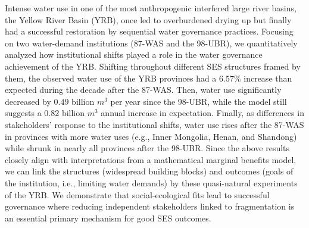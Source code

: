 
Intense water use in one of the most anthropogenic interfered large river basins, the Yellow River Basin (YRB), once led to overburdened drying up but finally had a successful restoration by sequential water governance practices.
Focusing on two water-demand institutions (87-WAS and the 98-UBR), we quantitatively analyzed how institutional shifts played a role in the water governance achievement of the YRB.
Shifting throughout different SES structures framed by them, the observed water use of the YRB provinces had a $6.57\%$ increase than expected during the decade after the 87-WAS.
Then, water use significantly decreased by $0.49$ billion $m^3$ per year since the 98-UBR, while the model still suggests a $0.82$ billion $m^3$ annual increase in expectation.
Finally, as differences in stakeholders' response to the institutional shifts, water use rises after the 87-WAS in provinces with more water uses (e.g., Inner Mongolia, Henan, and Shandong) while shrunk in nearly all provinces after the 98-UBR.
Since the above results closely align with interpretations from a mathematical marginal benefits model, we can link the structures (widespread building blocks) and outcomes (goals of the institution, i.e., limiting water demands) by these quasi-natural experiments of the YRB.
We demonstrate that social-ecological fits lead to successful governance where reducing independent stakeholders linked to fragmentation is an essential primary mechanism for good SES outcomes.
